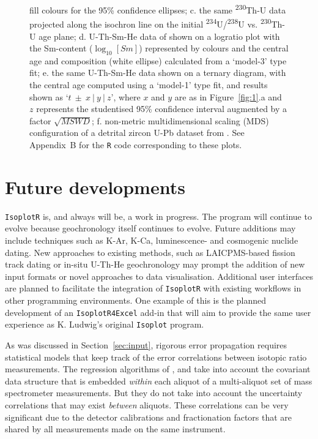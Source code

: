 \documentclass{article}
\begin{document}
\begin{figure}[p]
{    fill colours for the 95\% confidence ellipses; c. the same
    \textsuperscript{230}Th-U data projected along the isochron line
    on the initial \textsuperscript{234}U/\textsuperscript{238}U vs.
    \textsuperscript{230}Th-U age plane; d. U-Th-Sm-He data of
    \citet{vermeesch2008a} shown on a logratio plot with the
    Sm-content ($\log_{10}[Sm]$) represented by colours and the
    central age and composition (white ellipse) calculated from a
    `model-3' type fit; e. the same U-Th-Sm-He data shown on a ternary
    diagram, with the central age computed using a `model-1' type fit,
    and results shown as `$t~\pm~x~|~y~|~z$', where $x$ and $y$ are as
    in Figure~\ref{fig:1}.a and $z$ represents the studentised 95\%
    confidence interval augmented by a factor $\sqrt{MSWD}$;
    f. non-metric multidimensional scaling (MDS) configuration of a
    detrital zircon U-Pb dataset from \citet{vermeesch2015}. See
    Appendix~B for the \texttt{R} code corresponding to these plots.}
  \label{fig:2}
\end{figure}

\section{Future developments}
\label{sec:future}

\texttt{IsoplotR} is, and always will be, a work in progress. The
program will continue to evolve because geochronology itself continues
to evolve.  Future additions may include techniques such as K-Ar,
K-Ca, luminescence- and cosmogenic nuclide dating.  New approaches to
existing methods, such as LAICPMS-based fission track dating or
in-situ U-Th-He geochronology may prompt the addition of new input
formats or novel approaches to data visualisation. Additional user
interfaces are planned to facilitate the integration of
\texttt{IsoplotR} with existing workflows in other programming
environments. One example of this is the planned development of an
\texttt{IsoplotR4Excel} add-in that will aim to provide the same user
experience as K. Ludwig's original \texttt{Isoplot} program.

As was discussed in Section~\ref{sec:input}, rigorous error
propagation requires statistical models that keep track of the error
correlations between isotopic ratio measurements. The regression
algorithms of \citet{york1969}, \citet{ludwig1994} and
\citet{ludwig1998} take into account the covariant data structure that
is embedded \emph{within} each aliquot of a multi-aliquot set of mass
spectrometer measurements. But they do not take into account the
uncertainty correlations that may exist \emph{between} aliquots.
These correlations can be very significant due to the detector
calibrations and fractionation factors that are shared by all
measurements made on the same instrument.\\
\end{document}
